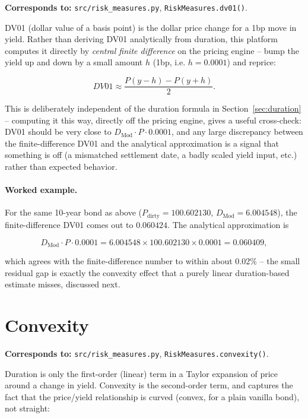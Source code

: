 \documentclass[11pt]{article}
\begin{document}
\textbf{Corresponds to:} \texttt{src/risk\_measures.py}, \texttt{RiskMeasures.dv01()}.

DV01 (dollar value of a basis point) is the dollar price change for a 1bp move in yield. Rather
than deriving DV01 analytically from duration, this platform computes it directly by
\emph{central finite difference} on the pricing engine -- bump the yield up and down by a small
amount $h$ (1bp, i.e. $h = 0.0001$) and reprice:

\begin{equation}
  DV01 \approx \frac{P(y-h) - P(y+h)}{2}.
  \label{eq:dv01}
\end{equation}

This is deliberately independent of the duration formula in Section~\ref{sec:duration} --
computing it this way, directly off the pricing engine, gives a useful cross-check: DV01 should
be very close to $D_{\text{Mod}} \cdot P \cdot 0.0001$, and any large discrepancy between the
finite-difference DV01 and the analytical approximation is a signal that something is off
(a mismatched settlement date, a badly scaled yield input, etc.) rather than expected behavior.

\paragraph{Worked example.} For the same 10-year bond as above ($P_{\text{dirty}} = 100.602130$,
$D_{\text{Mod}} = 6.004548$), the finite-difference DV01 comes out to $0.060424$. The analytical
approximation is

\[
  D_{\text{Mod}} \cdot P \cdot 0.0001 = 6.004548 \times 100.602130 \times 0.0001 = 0.060409,
\]

which agrees with the finite-difference number to within about 0.02\% -- the small residual gap
is exactly the convexity effect that a purely linear duration-based estimate misses, discussed
next.

\section{Convexity}
\label{sec:convexity}

\textbf{Corresponds to:} \texttt{src/risk\_measures.py}, \texttt{RiskMeasures.convexity()}.

Duration is only the first-order (linear) term in a Taylor expansion of price around a change
in yield. Convexity is the second-order term, and captures the fact that the price/yield
relationship is curved (convex, for a plain vanilla bond), not straight:
\end{document}
